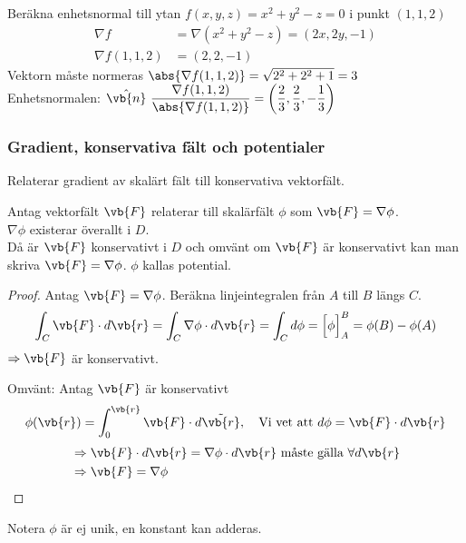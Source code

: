 \begin{example}[3.4]
Beräkna enhetsnormal till ytan $f(x, y, z) = x^2 + y^2 - z = 0$ i punkt $(1, 1, 2)$
\begin{align*}
\nabla f &= \nabla(x^2 + y^2 - z) = (2x, 2y, -1) \\
\nabla f(1, 1, 2) &= (2, 2, -1)
\end{align*}
Vektorn måste normeras $\abs{\nabla f(1, 1, 2)} = \sqrt{2^2 + 2^2 + 1} = 3$\\
Enhetsnormalen: $\displaystyle \hat{\vb{n}}\ \frac{\nabla f(1, 1, 2)}{\abs{\nabla f(1, 1, 2)}} = \left( \frac{2}{3}, \frac{2}{3}, -\frac{1}{3} \right)$
\end{example}

\subsubsection*{Gradient, konservativa fält och potentialer}
\begin{theorem}[3.1]
Relaterar gradient av skalärt fält till konservativa vektorfält.

Antag vektorfält $\vb{F}$ relaterar till skalärfält $\phi$ som $\vb{F} = \nabla\phi$.\\
$\nabla\phi$ existerar överallt i $D$.\\
Då är $\vb{F}$ konservativt i $D$ och omvänt om $\vb{F}$ är konservativt kan man skriva $\vb{F} = \nabla\phi$. $\phi$ kallas potential.
\end{theorem}

\begin{proof}
Antag $\vb{F} = \nabla\phi$. Beräkna linjeintegralen från $A$ till $B$ längs $C$.
\[ \int_C \vb{F} \cdot d\vb{r} = \int_C \nabla\phi \cdot d\vb{r} = \int_C d\phi = \Big[ \phi \Big]_A^B = \phi(B) - \phi(A) \]
$\Rightarrow \vb{F}$ är konservativt.

Omvänt: Antag $\vb{F}$ är konservativt
\[ \phi(\vb{r}) = \int_0^{\vb{r}} \vb{F} \cdot d\tilde{\vb{r}}, \quad \text{Vi vet att } d\phi = \vb{F} \cdot d\vb{r} \]
\begin{align*}
&\Rightarrow \vb{F} \cdot d\vb{r} = \nabla\phi \cdot d\vb{r} \text{ måste gälla } \forall d\vb{r} \\
&\Rightarrow \vb{F} = \nabla\phi
\end{align*}
\end{proof}

\begin{note}
Notera $\phi$ är ej unik, en konstant kan adderas.
\end{note}
